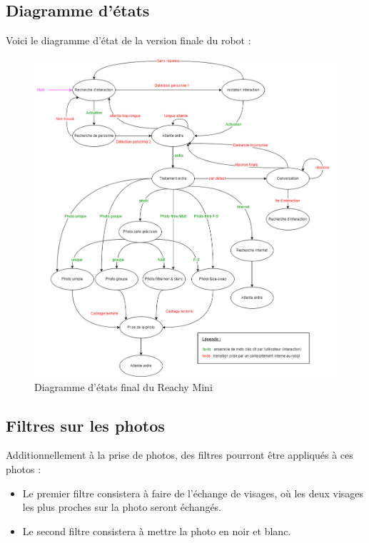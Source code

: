 \subsection{Diagramme d'états}
Voici le diagramme d'état de la version finale du robot :\\
\begin{center}
    \begin{figure}[!ht]
    \includegraphics[width=\textwidth]{Diagramme-etat2.png}
    \caption{Diagramme d'états final du Reachy Mini}
    \label{fig:diag1}
    \end{figure}
\end{center}
\newpage

\newpage

\subsection{Filtres sur les photos}\label{filtres}
\noindent Additionnellement à la prise de photos, des filtres pourront être appliqués à ces photos :
\begin{itemize}
    \item Le premier filtre consistera à faire de l'échange de visages, où les deux visages les plus proches sur la photo seront échangés.
    \item Le second filtre consistera à mettre la photo en noir et blanc.
\end{itemize}

